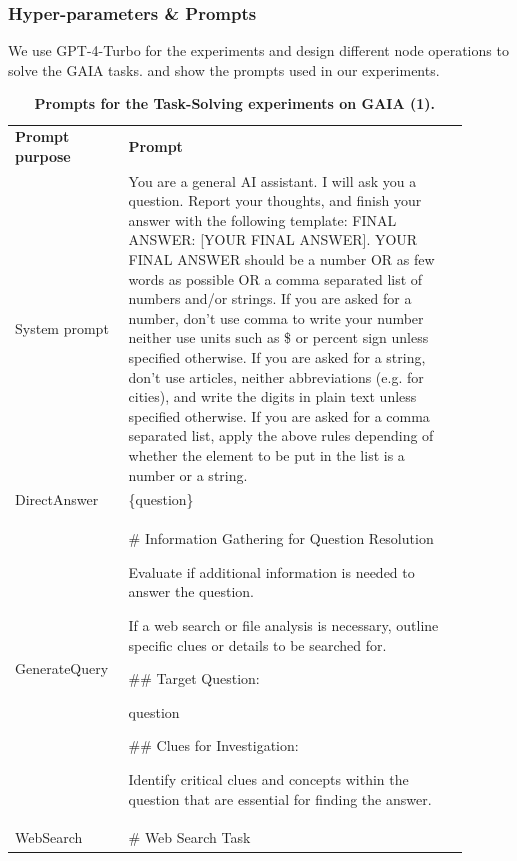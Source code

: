 \documentclass{article}
\theoremstyle{plain}
\theoremstyle{definition}
\theoremstyle{remark}
\begin{document}
\subsubsection{Hyper-parameters \& Prompts}
We use GPT-4-Turbo for the experiments and design different node operations to solve the GAIA tasks.
 and  show the prompts used in our experiments.  


\newpage
\begin{table}[t!]
  \centering
  \caption{\textbf{Prompts for the Task-Solving experiments on GAIA (1).}}
  \label{tab:gaia_prompts1}
  
  \renewcommand\tabcolsep{10pt}
  \renewcommand\arraystretch{1.3}
  \footnotesize 
  \begin{tabular}{|p{0.2\linewidth}|p{0.7\linewidth}|} 
    \Xhline{1.2pt}
    \rowcolor{champagne} 
    \textbf{Prompt purpose} & \textbf{Prompt} \\
    \Xhline{1.2pt}
        System prompt & You are a general AI assistant. I will ask you a question. Report your thoughts, and finish your answer with the following template: FINAL ANSWER: [YOUR FINAL ANSWER]. 
YOUR FINAL ANSWER should be a number OR as few words as possible OR a comma separated list of numbers and/or strings. 
If you are asked for a number, don't use comma to write your number neither use units such as \$ or percent sign unless specified otherwise. 
If you are asked for a string, don't use articles, neither abbreviations (e.g. for cities), and write the digits in plain text unless specified otherwise. 
If you are asked for a comma separated list, apply the above rules depending of whether the element to be put in the list is a number or a string.  \\
    \Xhline{1.2pt}
    DirectAnswer 
    &  \{question\}
   \\ \Xhline{1.2pt} 
    GenerateQuery 
    &  \# Information Gathering for Question Resolution
    
    Evaluate if additional information is needed to answer the question. 

If a web search or file analysis is necessary, outline specific clues or details to be searched for.

\#\# Target Question:

{question}

\#\#  Clues for Investigation:

Identify critical clues and concepts within the question that are essential for finding the answer.
    \\ \Xhline{1.2pt}
    WebSearch 
    &              \# Web Search Task
    

\end{tabular}
\end{table}
\end{document}
